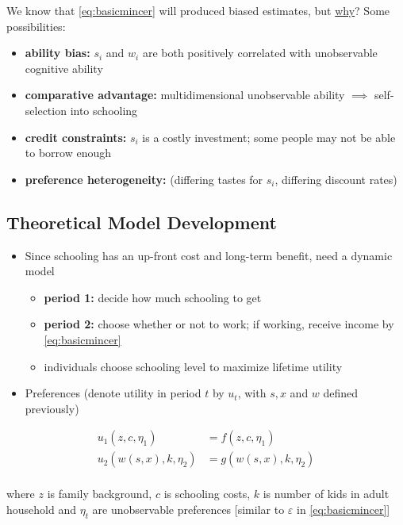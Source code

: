 \documentclass[11pt]{article}
\begin{document}
We know that \eqref{eq:basicmincer} will produced biased estimates, but \uline{why}? Some possibilities:

\begin{itemize}
\item \textbf{ability bias:} \(s_i\) and \(w_i\) are both positively correlated with unobservable cognitive ability
\item \textbf{comparative advantage:} multidimensional unobservable ability \(\implies\) self-selection into schooling
\item \textbf{credit constraints:} \(s_i\) is a costly investment; some people may not be able to borrow enough
\item \textbf{preference heterogeneity:} (differing tastes for \(s_i\), differing discount rates)
\end{itemize}

\subsection{Theoretical Model Development}
\label{sec:org2dc93f9}

\begin{itemize}
\item Since schooling has an up-front cost and long-term benefit, need a dynamic model
\begin{itemize}
\item \textbf{period 1:} decide how much schooling to get
\item \textbf{period 2:} choose whether or not to work; if working, receive income by \eqref{eq:basicmincer}
\item individuals choose schooling level to maximize lifetime utility
\end{itemize}
\item Preferences (denote utility in period \(t\) by \(u_t\), with \(s,x\) and \(w\) defined previously)
\end{itemize}


\begin{align}
u_1\left(z,c,\eta_1\right) & = f\left(z,c,\eta_1\right) \nonumber \\
u_2\left(w\left(s,x\right),k,\eta_2\right) & = g\left(w\left(s,x\right),k,\eta_2\right) \\
\label{eq:utils}
\end{align}

where \(z\) is family background, \(c\) is schooling costs, \(k\) is number of kids in adult household and \(\eta_t\) are unobservable preferences [similar to \(\varepsilon\) in \eqref{eq:basicmincer}]
\end{document}
